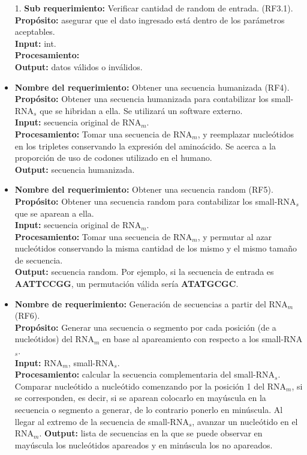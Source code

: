 \documentclass[12pt,a4paper,spanish]{article}
\begin{document}
\begin{itemize}
		1. \textbf{Sub requerimiento:} Verificar cantidad de random de entrada. (RF3.1).\\
 	    \textbf{Propósito:} asegurar que el dato ingresado está dentro de los parámetros aceptables. \\						
		\textbf{Input:} int.\\
		\textbf{Procesamiento:} \\
		\textbf{Output:} datos válidos o inválidos.\\

		\item \textbf{Nombre del requerimiento:} Obtener una secuencia humanizada (RF4).\\
 	    \textbf{Propósito:} Obtener una secuencia humanizada para contabilizar los small-RNA$_s$ 
							que se hibridan a ella. Se utilizará un software externo.\\
		\textbf{Input:} secuencia original de RNA$_m$.\\
		\textbf{Procesamiento:} Tomar una secuencia de RNA$_m$, y reemplazar nucleótidos en los tripletes conservando la expresión del aminoácido. Se 									acerca a la proporción de uso de codones utilizado en el humano. \\
		\textbf{Output:} secuencia humanizada.\\

		\item \textbf{Nombre del requerimiento:} Obtener una secuencia random (RF5).\\
 	    \textbf{Propósito:} Obtener una secuencia random para contabilizar los small-RNA$_s$ que se aparean a ella.\\
		\textbf{Input:} secuencia original de RNA$_m$.\\
		\textbf{Procesamiento:} Tomar una secuencia de RNA$_m$, y permutar al azar nucleótidos conservando la misma cantidad de los mismo y el 									mismo tamaño de secuencia. \\
		\textbf{Output:} secuencia random. Por ejemplo, si la secuencia de entrada es \textbf{AATTCCGG}, un permutación válida sería 							\textbf{ATATGCGC}. 	\\

		\item \textbf{Nombre de requerimiento:} Generación de secuencias a partir del RNA$_m$ (RF6).\\
 	    \textbf{Propósito:} Generar una secuencia o segmento por cada posición (de a nucleótidos) del RNA$_m$ en base al apareamiento con respecto a los 								small-RNA$_s$.\\ 
		\textbf{Input:} RNA$_m$, small-RNA$_s$. \\
		\textbf{Procesamiento:} calcular la secuencia complementaria del small-RNA$_s$. Comparar nucleótido a nucleótido comenzando por la posición 1 del 									RNA$_m$, si se corresponden, es decir, si se aparean colocarlo en mayúscula en la secuencia o segmento a generar, de lo 								contrario ponerlo en minúscula. Al llegar al extremo de la secuencia de small-RNA$_s$, avanzar un nucleótido en el
								RNA$_m$.							
		\textbf{Output:} lista de secuencias en la que se puede observar en mayúscula los nucleótidos apareados y en minúscula los no apareados.\\


\end{itemize}
\end{document}

